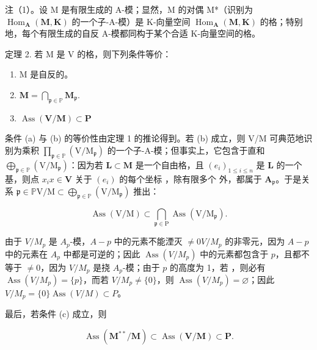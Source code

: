 注（1）。设 M 是有限生成的 A-模；显然，M 的对偶 M*（识别为 \(\operatorname{Hom}_{\mathbf{A}}(\mathbf{M}, \mathbf{K})\) 的一个子-A-模）是 K-向量空间 \(\operatorname{Hom}_{\mathbf{A}}(\mathbf{M}, \mathbf{K})\) 的格；特别地，每个有限生成的自反 A-模都同构于某个合适 K-向量空间的格。

定理 2. 若 M 是 V 的格，则下列条件等价：

\begin{enumerate}
\def\labelenumi{(\alph{enumi})}
\item
  M 是自反的。
\item
  \(\mathbf{M} = \bigcap_{\mathfrak{p}\in \mathbb{P}}\mathbf{M}_{\mathfrak{p}}.\)
\item
  \(\operatorname{Ass}(\mathbf{V} / \mathbf{M})\subset \mathbf{P}\)
\end{enumerate}

条件 (a) 与 (b) 的等价性由定理 1 的推论得到。若 (b) 成立，则 V/M 可典范地识别为乘积 \(\prod_{\mathfrak{p} \in \mathbb{P}} (\mathrm{V} / \mathrm{M}_{\mathfrak{p}})\) 的一个子-A-模；但事实上，它包含于直和 \(\bigoplus_{\mathfrak{p} \in \mathbb{P}} (\mathrm{V} / \mathrm{M}_{\mathfrak{p}})\)：因为若 \(\mathbf{L} \subset \mathbf{M}\) 是一个自由格，且 \((e_i)_{1 \leq i \leq n}\) 是 \(\mathbf{L}\) 的一个基，则点 \(x_i\)\(x \in \mathbf{V}\) 关于 \((e_i)\) 的每个坐标 ，除有限多个  外，都属于 \(\mathbf{A}_{\mathfrak{p}}\)。于是关系 \(\mathfrak{p} \in \mathbb{P}\)\(\mathrm{V} / \mathrm{M} \subset \bigoplus_{\mathfrak{p} \in \mathbb{P}} (\mathrm{V} / \mathrm{M}_{\mathfrak{p}})\) 推出：

\[
\operatorname{Ass} (\mathrm{V} / \mathrm{M}) \subset \bigcap_ {\mathfrak {p} \in \mathrm{P}} \operatorname{Ass} (\mathrm{V} / \mathrm{M} _ {\mathfrak {p}}).
\]

由于 \(V / M_{p}\) 是 \(A_{p}\)-模，\(A - p\) 中的元素不能湮灭 \(\neq 0\)\(V / M_{p}\) 的非零元，因为 \(A - p\) 中的元素在 \(A_{p}\) 中都是可逆的；因此 \(\operatorname{Ass}(V / M_{p})\) 中的元素都包含于 \(p\)，且都不等于 \(\neq 0\)，因为 \(V / M_{p}\) 是挠 \(A_{p}\)-模；由于 \(p\) 的高度为 1，若 ，则必有 \(\operatorname{Ass}(V / M_{p}) = \{p\}\)，而若 \(V / M_{p} \neq \{0\}\)，则 \(\operatorname{Ass}(V / M_{p}) = \varnothing\)；因此 \(V / M_{p} = \{0\}\)\(\operatorname{Ass}(V / M) \subset P\)。

最后，若条件 (c) 成立，则

\[
\operatorname{Ass} (\mathbf {M} ^ {* *} / \mathbf {M}) \subset \operatorname{Ass} (\mathbf {V} / \mathbf {M}) \subset \mathbf {P}.
\]

